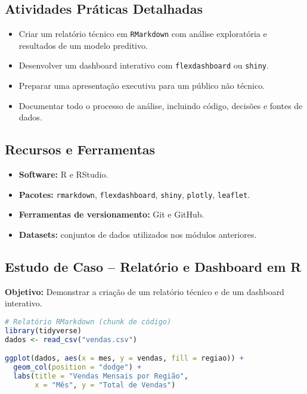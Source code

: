 \subsection{\textcolor{subsectionblue}{Atividades Práticas Detalhadas}}
\begin{itemize}
  \item Criar um relatório técnico em \texttt{RMarkdown} com análise exploratória e resultados de um modelo preditivo.
  \item Desenvolver um dashboard interativo com \texttt{flexdashboard} ou \texttt{shiny}.
  \item Preparar uma apresentação executiva para um público não técnico.
  \item Documentar todo o processo de análise, incluindo código, decisões e fontes de dados.
\end{itemize}

\subsection{\textcolor{subsectionblue}{Recursos e Ferramentas}}
\begin{itemize}
  \item \textbf{Software:} R e RStudio.
  \item \textbf{Pacotes:} \texttt{rmarkdown}, \texttt{flexdashboard}, \texttt{shiny}, \texttt{plotly}, \texttt{leaflet}.
  \item \textbf{Ferramentas de versionamento:} Git e GitHub.
  \item \textbf{Datasets:} conjuntos de dados utilizados nos módulos anteriores.
\end{itemize}

\subsection{\textcolor{subsectionblue}{Estudo de Caso – Relatório e Dashboard em R}}
\textbf{Objetivo:} Demonstrar a criação de um relatório técnico e de um dashboard interativo.

\begin{lstlisting}[language=R]
# Relatório RMarkdown (chunk de código)
library(tidyverse)
dados <- read_csv("vendas.csv")

ggplot(dados, aes(x = mes, y = vendas, fill = regiao)) +
  geom_col(position = "dodge") +
  labs(title = "Vendas Mensais por Região",
       x = "Mês", y = "Total de Vendas")
\end{lstlisting}

